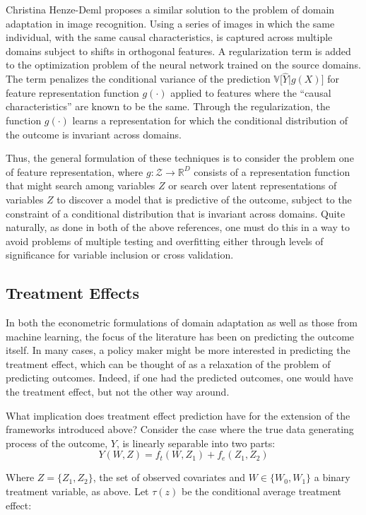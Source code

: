 \documentclass[a4paper,12pt]{article}
\begin{document}
Christina Henze-Deml \parencite*{Heinze-deml2017} proposes a similar solution to the problem of domain adaptation in image recognition. Using a series of images in which the same individual, with the same causal characteristics, is captured across multiple domains subject to shifts in orthogonal features. A regularization term is added to the optimization problem of the neural network trained on the source domains. The term penalizes the conditional variance of the prediction $\mathbb{V}\big[ \hat{Y}| g(X) \big]$ for feature representation function $g(\cdot)$ applied to features where the ``causal characteristics'' are known to be the same. Through the regularization, the function $g(\cdot)$ learns a representation for which the conditional distribution of the outcome is invariant across domains.

Thus, the general formulation of these techniques is to consider the problem one of feature representation, where $g: \mathcal{Z} \rightarrow \mathbb{R}^D$ consists of a representation function that might search among variables $Z$ or search over latent representations of variables $Z$ to discover a model that is predictive of the outcome, subject to the constraint of a conditional distribution that is invariant across domains. Quite naturally, as done in both of the above references, one must do this in a way to avoid problems of multiple testing and overfitting either through levels of significance for variable inclusion or cross validation.

\subsection{Treatment Effects}

In both the econometric formulations of domain adaptation as well as those from machine learning, the focus of the literature has been on predicting the outcome itself. In many cases, a policy maker might be more interested in predicting the treatment effect, which can be thought of as a relaxation of the problem of predicting outcomes. Indeed, if one had the predicted outcomes, one would have the treatment effect, but not the other way around.

What implication does treatment effect prediction have for the extension of the frameworks introduced above? Consider the case where the true data generating process of the outcome, $Y$, is linearly separable into two parts:
%
$$
Y(W,Z) = f_t(W,Z_1) + f_e(Z_1, Z_2)
$$

Where $Z = \{ Z_1, Z_2 \}$, the set of observed covariates and $W \in \{ W_0, W_1 \}$ a binary treatment variable, as above. Let $\tau(z)$ be the conditional average treatment effect:
\end{document}

